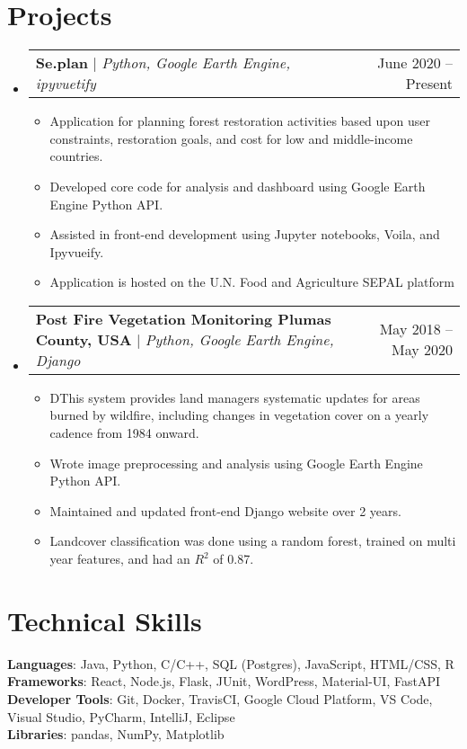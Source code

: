 \documentclass[letterpaper,11pt]{article}
\makeatletter
\newcommand{\resumeItem}[1]{
  \item\small{
    {#1 \vspace{-2pt}}
  }
}
\newcommand{\resumeProjectHeading}[2]{
    \item
    \begin{tabular*}{0.97\textwidth}{l@{\extracolsep{\fill}}r}
      \small#1 & #2 \\
    \end{tabular*}\vspace{-7pt}
}
\newcommand{\resumeSubHeadingListStart}{\begin{itemize}[leftmargin=0.15in, label={}]}
\newcommand{\resumeSubHeadingListEnd}{\end{itemize}}
\newcommand{\resumeItemListStart}{\begin{itemize}}
\newcommand{\resumeItemListEnd}{\end{itemize}\vspace{-5pt}}
\makeatother
\begin{document}
\section{Projects}
    \resumeSubHeadingListStart
      \resumeProjectHeading
          {\textbf{Se.plan} $|$ \emph{Python, Google Earth Engine, ipyvuetify}}{June 2020 -- Present}
          \resumeItemListStart
            \resumeItem{Application for planning forest restoration activities based upon user constraints, restoration goals, and cost for low and middle-income countries.}
            \resumeItem{Developed core code for analysis and dashboard using Google Earth Engine Python API.}
            \resumeItem{Assisted in front-end development using Jupyter notebooks, Voila, and Ipyvueify.}
            \resumeItem{Application is hosted on the U.N. Food and Agriculture SEPAL platform}
          \resumeItemListEnd
      \resumeProjectHeading
          {\textbf{Post Fire Vegetation Monitoring Plumas County, USA} $|$ \emph{Python, Google Earth Engine, Django}}{May 2018 -- May 2020}
          \resumeItemListStart
            \resumeItem{DThis system provides land managers systematic updates for areas burned by wildfire, including changes in vegetation cover on a yearly cadence from 1984 onward.}
            \resumeItem{Wrote image preprocessing and analysis using Google Earth Engine Python API.}
            \resumeItem{Maintained and updated front-end Django website over 2 years.}
            \resumeItem{Landcover classification was done using a random forest, trained on multi year features, and had an $R^2$ of 0.87.}
          \resumeItemListEnd
    \resumeSubHeadingListEnd



%
\section{Technical Skills}
 \begin{itemize}[leftmargin=0.15in, label={}]
    \small{\item{
     \textbf{Languages}{: Java, Python, C/C++, SQL (Postgres), JavaScript, HTML/CSS, R} \\
     \textbf{Frameworks}{: React, Node.js, Flask, JUnit, WordPress, Material-UI, FastAPI} \\
     \textbf{Developer Tools}{: Git, Docker, TravisCI, Google Cloud Platform, VS Code, Visual Studio, PyCharm, IntelliJ, Eclipse} \\
     \textbf{Libraries}{: pandas, NumPy, Matplotlib}
    }}
 \end{itemize}


\end{document}
